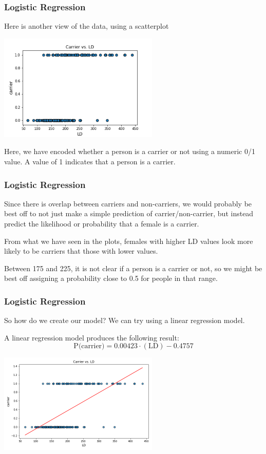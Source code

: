 \documentclass[11pt, table]{beamer}
\newcommand{\p}{\pause}
\begin{document}
\begin{frame}
\frametitle{Logistic Regression}

Here is another view of the data, using a scatterplot

\begin{center}
	\includegraphics[width = 3in]{images/Dystrophy/scatter_01.png}
\end{center}

Here, we have encoded whether a person is a carrier or not using a numeric 0/1 value. A value of 1 indicates that a person is a carrier. 
\end{frame}


\begin{frame}
\frametitle{Logistic Regression}
Since there is overlap between carriers and non-carriers, we would probably be best off to not just make a simple prediction of carrier/non-carrier, but instead predict the likelihood or probability that a female is a carrier.
\vspace{0.1in}

From what we have seen in the plots, females with higher LD values look more likely to be carriers that those with lower values.
\vspace{0.1in}

 Between 175 and 225, it is not clear if a person is a carrier or not, so we might be best off assigning a probability close to 0.5 for people in that range.
\end{frame}

\begin{frame}
\frametitle{Logistic Regression}
So how do we create our model? We can try using a linear regression model.\p
\vspace{0.1in}

A linear regression model produces the following result:
$$\text{P(carrier)} = 0.00423\cdot(\text{LD}) - 0.4757$$

\begin{center}
	\includegraphics[width = 3in]{images/Dystrophy/scatter_02.png}
\end{center}
\end{frame}
\end{document}
